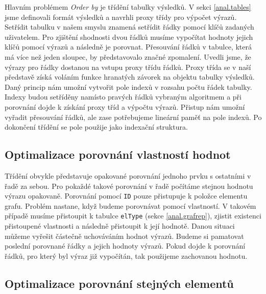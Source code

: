 Hlavním problémem \textit{Order by} je třídění tabulky výsledků.
V sekci \ref{anal.tables} jsme definovali formát výsledků a navrhli proxy třídy pro výpočet výrazů.
Setřídit tabulku v našem smyslu znamená setřídit řádky pomocí klíčů zadaných uživatelem.
Pro zjištění shodnosti dvou řádků musíme vypočítat hodnoty jejich klíčů pomocí výrazů a následně je porovnat.
Přesouvání řádků v tabulce, která má více než jeden sloupec, by představovalo značné zpomalení.
Uvedli jsme, že výrazy pro řádky dostanou na vstupu proxy třídu řádků.
Proxy třída se v naší představě získá voláním funkce hranatých závorek na objektu tabulky výsledků.
Daný princip nám umožní vytvořit pole indexů v rozsahu počtu řádek tabulky.
Indexy budou setříděny namísto pravých řádků vybraným algoritmem a při porovnání dojde k získání proxy tříd a výpočtu výrazů.
Přistup nám umožní vyřadit přesouvání řádků, ale zase potřebujeme lineární paměť na pole indexů.
Po dokončení třídění se pole použije jako indexační struktura.

\subsection{Optimalizace porovnání vlastností hodnot} \label{anal.orderby.opt1}

Třídění obvykle představuje opakované porovnání jednoho prvku s ostatními v řadě za sebou.
Pro pokaždé takové porovnání v řadě počítáme stejnou hodnotu výrazu opakovaně.
Porovnání pomocí \texttt{ID} pouze přistupuje k položce elementu grafu.
Problém nastane, když budeme porovnávat pomocí vlastností.
V takovém případě musíme přistoupit k tabulce \texttt{elType} (sekce \ref{anal.grafrep}), zjistit existenci přistoupené vlastnosti a následně přistoupit k její hodnotě.
Danou situaci můžeme vyřešit částečně uchováváním hodnot výrazů.
Budeme si pamatovat poslední porovnané řádky a jejich hodnoty výrazů.
Pokud dojde k porovnání řádků, pro který byl výraz již vypočítán, tak použijeme zachovanou hodnotu.

\subsection{Optimalizace porovnání stejných elementů} \label{anal.orderby.opt2}


